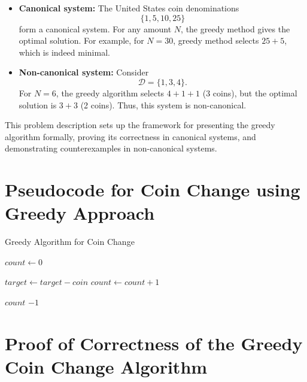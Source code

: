 \documentclass[12pt,a4paper]{report}
\begin{document}
\begin{itemize}
    \item \textbf{Canonical system:} The United States coin denominations 
    \[
    \{1, 5, 10, 25\}
    \]
    form a canonical system. For any amount $N$, the greedy method gives the optimal solution. For example, for $N = 30$, greedy method selects $25 + 5$, which is indeed minimal.

    \item \textbf{Non-canonical system:} Consider 
    \[ \mathcal{D} = \{1, 3, 4\}.\] 
    For $N = 6$, the greedy algorithm selects $4 + 1 + 1$ (3 coins), but the optimal solution is $3 + 3$ (2 coins). Thus, this system is non-canonical.
\end{itemize}

This problem description sets up the framework for presenting the greedy algorithm formally, proving its correctness in canonical systems, and demonstrating counterexamples in non-canonical systems.


\section{Pseudocode for Coin Change using Greedy Approach}

\begin{algorithm}
\caption{Greedy Algorithm for Coin Change}
\begin{algorithmic}[1]
    \State {}
    \State $count \gets 0$ 
    
            \State $target \gets target - coin$ 
            \State $count \gets count + 1$ 
        \EndWhile
    \EndFor
    
        \State \Return $count$ 
    \Else
        \State \Return $-1$ 
    \EndIf
\EndProcedure
\end{algorithmic}
\end{algorithm}

\section{Proof of Correctness of the Greedy Coin Change Algorithm}
\end{document}
